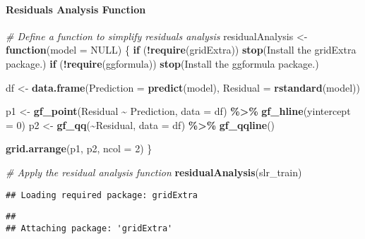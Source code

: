 \documentclass[
]{article}
\newenvironment{Shaded}{\begin{snugshade}}{\end{snugshade}}
\newcommand{\AttributeTok}[1]{\textcolor[rgb]{0.13,0.29,0.53}{#1}}
\newcommand{\CommentTok}[1]{\textcolor[rgb]{0.56,0.35,0.01}{\textit{#1}}}
\newcommand{\ConstantTok}[1]{\textcolor[rgb]{0.56,0.35,0.01}{#1}}
\newcommand{\ControlFlowTok}[1]{\textcolor[rgb]{0.13,0.29,0.53}{\textbf{#1}}}
\newcommand{\DecValTok}[1]{\textcolor[rgb]{0.00,0.00,0.81}{#1}}
\newcommand{\FunctionTok}[1]{\textcolor[rgb]{0.13,0.29,0.53}{\textbf{#1}}}
\newcommand{\NormalTok}[1]{#1}
\newcommand{\OtherTok}[1]{\textcolor[rgb]{0.56,0.35,0.01}{#1}}
\newcommand{\SpecialCharTok}[1]{\textcolor[rgb]{0.81,0.36,0.00}{\textbf{#1}}}
\newcommand{\StringTok}[1]{\textcolor[rgb]{0.31,0.60,0.02}{#1}}
\begin{document}
\paragraph{Residuals Analysis
Function}\label{residuals-analysis-function}

\begin{Shaded}
\begin{Highlighting}[]
\CommentTok{\# Define a function to simplify residuals analysis}
\NormalTok{residualAnalysis }\OtherTok{\textless{}{-}} \ControlFlowTok{function}\NormalTok{(}\AttributeTok{model =} \ConstantTok{NULL}\NormalTok{) \{}
  \ControlFlowTok{if}\NormalTok{ (}\SpecialCharTok{!}\FunctionTok{require}\NormalTok{(gridExtra)) }\FunctionTok{stop}\NormalTok{(}\StringTok{\textquotesingle{}Install the gridExtra package.\textquotesingle{}}\NormalTok{)}
  \ControlFlowTok{if}\NormalTok{ (}\SpecialCharTok{!}\FunctionTok{require}\NormalTok{(ggformula)) }\FunctionTok{stop}\NormalTok{(}\StringTok{\textquotesingle{}Install the ggformula package.\textquotesingle{}}\NormalTok{)}
  
\NormalTok{  df }\OtherTok{\textless{}{-}} \FunctionTok{data.frame}\NormalTok{(}\AttributeTok{Prediction =} \FunctionTok{predict}\NormalTok{(model),}
                   \AttributeTok{Residual =} \FunctionTok{rstandard}\NormalTok{(model))}
  
\NormalTok{  p1 }\OtherTok{\textless{}{-}} \FunctionTok{gf\_point}\NormalTok{(Residual }\SpecialCharTok{\textasciitilde{}}\NormalTok{ Prediction, }\AttributeTok{data =}\NormalTok{ df) }\SpecialCharTok{\%\textgreater{}\%} \FunctionTok{gf\_hline}\NormalTok{(}\AttributeTok{yintercept =} \DecValTok{0}\NormalTok{)}
\NormalTok{  p2 }\OtherTok{\textless{}{-}} \FunctionTok{gf\_qq}\NormalTok{(}\SpecialCharTok{\textasciitilde{}}\NormalTok{Residual, }\AttributeTok{data =}\NormalTok{ df) }\SpecialCharTok{\%\textgreater{}\%} \FunctionTok{gf\_qqline}\NormalTok{()}
  
  \FunctionTok{grid.arrange}\NormalTok{(p1, p2, }\AttributeTok{ncol =} \DecValTok{2}\NormalTok{)}
\NormalTok{\}}

\CommentTok{\# Apply the residual analysis function}
\FunctionTok{residualAnalysis}\NormalTok{(slr\_train)}
\end{Highlighting}
\end{Shaded}

\begin{verbatim}
## Loading required package: gridExtra
\end{verbatim}

\begin{verbatim}
## 
## Attaching package: 'gridExtra'
\end{verbatim}
\end{document}
